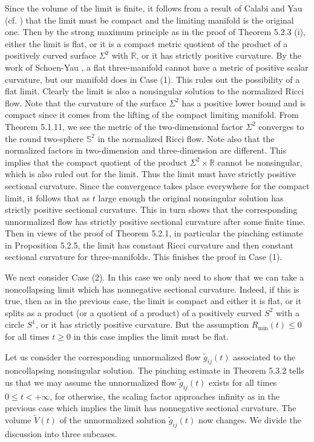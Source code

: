 Since the volume of the limit is finite, it follows from a result
of Calabi and Yau (cf. \cite{ScY}) that the limit must be compact
and the limiting manifold is the original one. Then by the strong
maximum principle as in the proof of Theorem 5.2.3 (i), either the
limit is flat, or it is a compact metric quotient of the product
of a positively curved surface $\Sigma^2$ with $\mathbb{R}$, or it
has strictly positive curvature. By the work of Schoen-Yau
\cite{ScY79}, a flat three-manifold cannot have a metric of
positive scalar curvature, but our manifold does in Case (1). This
rules out the possibility of a flat limit. Clearly the limit is
also a nonsingular solution to the normalized Ricci flow. Note
that the curvature of the surface $\Sigma^2$ has a positive lower
bound and is compact since it comes from the lifting of the
compact limiting manifold. From Theorem 5.1.11, we see the metric
of the two-dimensional factor $\Sigma^2$ converges to the round
two-sphere $\mathbb{S}^2$ in the normalized Ricci flow. Note also
that the normalized factors in two-dimension and three-dimension
are different. This implies that the compact quotient of the
product $\Sigma^2 \times \mathbb{R}$ cannot be nonsingular, which
is also ruled out for the limit. Thus the limit must have strictly
positive sectional curvature. Since the convergence takes place
everywhere for the compact limit, it follows that as $t$ large
enough the original nonsingular solution has strictly positive
sectional curvature. This in turn shows that the corresponding
unnormalized flow has strictly positive sectional curvature after
some finite time. Then in views of the proof of Theorem 5.2.1, in
particular the pinching estimate in Proposition 5.2.5, the limit
has constant Ricci curvature and then constant sectional curvature
for three-manifolds. This finishes the proof in Case (1).

We next consider Case (2). In this case we only need to show that
we can take a noncollapsing limit which has nonnegative sectional
curvature. Indeed, if this is true, then as in the previous case,
the limit is compact and either it is flat, or it splits as a
product (or a quotient of a product) of a positively curved $S^2$
with a circle $S^1$, or it has strictly positive curvature. But
the assumption $R_{\min}(t)\leq0$ for all times $t\geq0$ in this
case implies the limit must be flat.

Let us consider the corresponding unnormalized flow
$\tilde{g}_{ij}(t)$ associated to the noncollapsing nonsingular
solution. The pinching estimate in Theorem 5.3.2 tells us that we
may assume the unnormalized flow $\tilde{g}_{ij}(t)$ exists for
all times $0\leq t<+\infty$, for otherwise, the scaling factor
approaches infinity as in the previous case which implies the
limit has nonnegative sectional curvature. The volume
$\tilde{V}(t)$ of the unnormalized solution $\tilde{g}_{ij}(t)$
now changes. We divide the discussion into three subcases.

